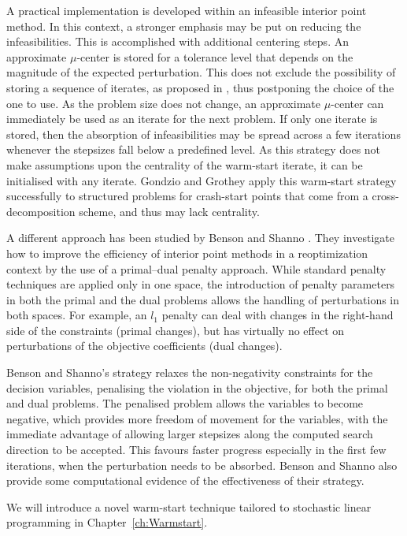 A practical implementation is developed within an infeasible interior 
point method. In this context, a stronger emphasis may be put on 
reducing the infeasibilities. This is accomplished with additional 
centering steps.
An approximate $\mu$-center is stored for a tolerance level that 
depends on the magnitude of the expected perturbation. This does not 
exclude the possibility of storing a sequence of iterates, as proposed 
in \cite{YildirimWright}, thus postponing the choice of the one to 
use.
As the problem size does not change, an approximate $\mu$-center 
can immediately be used as an iterate for the next problem.
If only one iterate is stored, then the absorption of infeasibilities 
may be spread across a few iterations whenever the stepsizes fall 
below a predefined level.
As this strategy does not make assumptions upon the centrality of the 
warm-start iterate,
it can be initialised with any iterate.
Gondzio and Grothey \cite{GondzioGrothey03} apply this warm-start 
strategy successfully to structured problems for crash-start points that 
come from a cross-decomposition scheme, and thus may lack centrality.

A different approach has been studied by Benson and Shanno 
\cite{BensonShanno}. They investigate how to improve the efficiency 
of interior point methods in a reoptimization context by the use of 
a primal--dual penalty approach.
While standard penalty techniques are applied only in one space, 
the introduction of penalty parameters in both the primal and the 
dual problems allows the handling of perturbations in both spaces.
For example, an $l_1$ penalty can deal with changes in the right-hand
side of the constraints (primal changes), but has virtually no effect
on perturbations of the objective coefficients (dual changes).

Benson and Shanno's strategy relaxes the non-negativity constraints
for the decision
variables, penalising the violation in the objective, for both
the primal and dual problems.
The penalised problem allows the variables to become negative,
which provides more freedom of movement for the variables, with
the immediate advantage of allowing larger stepsizes along 
the computed search direction to be accepted. This favours faster progress
especially in the first few iterations, when the perturbation needs
to be absorbed.
Benson and Shanno \cite{BensonShanno} also provide some computational
evidence of the effectiveness of their strategy.

We will introduce a novel warm-start technique tailored to stochastic
linear programming in Chapter~\ref{ch:Warmstart}.
